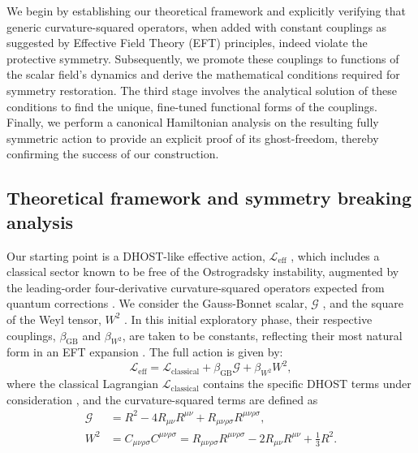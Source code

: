 \documentclass[twocolumn]{aastex631}
\begin{document}
We begin by establishing our theoretical framework and explicitly verifying that generic curvature-squared operators, when added with constant couplings as suggested by Effective Field Theory (EFT) principles, indeed violate the protective symmetry. Subsequently, we promote these couplings to functions of the scalar field's dynamics and derive the mathematical conditions required for symmetry restoration. The third stage involves the analytical solution of these conditions to find the unique, fine-tuned functional forms of the couplings. Finally, we perform a canonical Hamiltonian analysis on the resulting fully symmetric action to provide an explicit proof of its ghost-freedom, thereby confirming the success of our construction.

\subsection{Theoretical framework and symmetry breaking analysis}
Our starting point is a DHOST-like effective action, $\mathcal{L}_{\text{eff}}$ \citep{achour2020rotatingblackholesdhost}, which includes a classical sector known to be free of the Ostrogradsky instability, augmented by the leading-order four-derivative curvature-squared operators expected from quantum corrections \citep{eichhorn2025purelymetrichorndeskitheories,eichhorn2025purelymetrichorndeskitheories}. We consider the Gauss-Bonnet scalar, $\mathcal{G}$ \citep{eichhorn2025purelymetrichorndeskitheories}, and the square of the Weyl tensor, $W^2$ \citep{cheung2017positivitycurvaturesquaredcorrectionsgravity}. In this initial exploratory phase, their respective couplings, $\beta_{\text{GB}}$ and $\beta_{W^2}$, are taken to be constants, reflecting their most natural form in an EFT expansion \citep{cheung2017positivitycurvaturesquaredcorrectionsgravity,calmet2017gravitationaleffectiveactionsecond}. The full action is given by:
\begin{equation}
\mathcal{L}_{\text{eff}} = \mathcal{L}_{\text{classical}} + \beta_{\text{GB}} \mathcal{G} + \beta_{W^2} W^2,
\end{equation}
where the classical Lagrangian $\mathcal{L}_{\text{classical}}$ contains the specific DHOST terms under consideration \citep{ilyas2020dhostbounce,colléaux2024classificationgeneralisedhigherordereinsteinmaxwell}, and the curvature-squared terms are defined as
\begin{align}
\mathcal{G} &= R^2 - 4 R_{\mu\nu}R^{\mu\nu} + R_{\mu\nu\rho\sigma}R^{\mu\nu\rho\sigma}, \\
W^2 &= C_{\mu\nu\rho\sigma}C^{\mu\nu\rho\sigma} = R_{\mu\nu\rho\sigma}R^{\mu\nu\rho\sigma} - 2 R_{\mu\nu}R^{\mu\nu} + \frac{1}{3}R^2.
\end{align}
\end{document}
